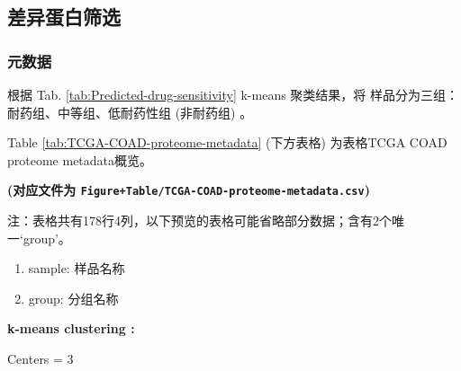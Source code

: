 \documentclass[
]{article}
\providecommand{\tightlist}{%
  \setlength{\itemsep}{0pt}\setlength{\parskip}{0pt}}
\begin{document}
\hypertarget{ux5deeux5f02ux86cbux767dux7b5bux9009}{%
\subsection{差异蛋白筛选}\label{ux5deeux5f02ux86cbux767dux7b5bux9009}}

\hypertarget{ux5143ux6570ux636e}{%
\subsubsection{元数据}\label{ux5143ux6570ux636e}}

根据 Tab. \ref{tab:Predicted-drug-sensitivity} k-means 聚类结果，将
样品分为三组：耐药组、中等组、低耐药性组 (非耐药组) 。

Table \ref{tab:TCGA-COAD-proteome-metadata} (下方表格) 为表格TCGA COAD proteome metadata概览。

\textbf{(对应文件为 \texttt{Figure+Table/TCGA-COAD-proteome-metadata.csv})}

\begin{center}\begin{tcolorbox}[colback=gray!10, colframe=gray!50, width=0.9\linewidth, arc=1mm, boxrule=0.5pt]注：表格共有178行4列，以下预览的表格可能省略部分数据；含有2个唯一`group'。
\end{tcolorbox}
\end{center}
\begin{center}\begin{tcolorbox}[colback=gray!10, colframe=gray!50, width=0.9\linewidth, arc=1mm, boxrule=0.5pt]\begin{enumerate}\tightlist
\item sample:  样品名称
\item group:  分组名称
\end{enumerate}\end{tcolorbox}
\end{center}\begin{center}\begin{tcolorbox}[colback=gray!10, colframe=gray!50, width=0.9\linewidth, arc=1mm, boxrule=0.5pt]
\textbf{
k-means clustering
:}

\vspace{0.5em}

    Centers = 3

\vspace{2em}
\end{tcolorbox}
\end{center}
\end{document}
